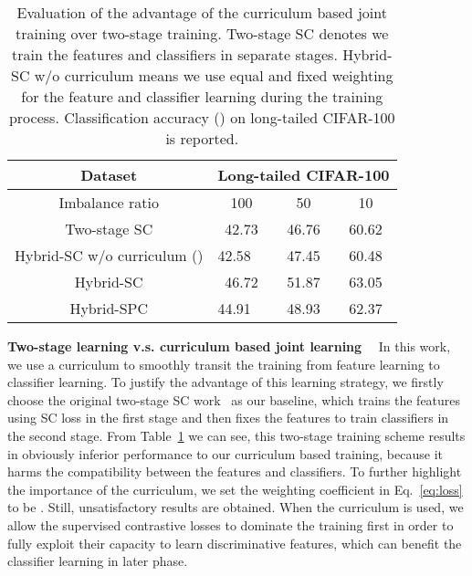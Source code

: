 \documentclass[final]{cvpr}
\begin{document}
\begin{table}[h]
\footnotesize
\center
\caption{Evaluation of the advantage of the curriculum based joint training over two-stage training. Two-stage SC denotes we train the features and classifiers in separate stages. Hybrid-SC w/o curriculum means we use equal and fixed weighting for the feature and classifier learning during the training process. Classification accuracy () on long-tailed CIFAR-100 is reported.}
\vspace{0.5em}
\label{tab:two-stage}
\begin{tabular}{|c||c|c|c|}
\hline
Dataset                                        & \multicolumn{3}{c|}{Long-tailed CIFAR-100}                                     \\ \hline 
Imbalance ratio                                & 100                        & \multicolumn{1}{c|}{50} & \multicolumn{1}{c|}{10} \\ \hline \hline
Two-stage SC                              & 42.73                      & 46.76                   & \multicolumn{1}{c|}{60.62}  \\ \hline
\multicolumn{1}{|l||}{Hybrid-SC w/o curriculum ()} & \multicolumn{1}{l|}{42.58} & 47.45                   & 60.48                   \\ \hline
Hybrid-SC                                      & 46.72                      & 51.87                   & 63.05                   \\ \hline
Hybrid-SPC                                     & \multicolumn{1}{l|}{44.91} & 48.93                   & 62.37                   \\ \hline
\end{tabular}
\end{table}


 
\par{\textbf{Two-stage learning v.s. curriculum based joint learning}}~~ In this work, we use a curriculum to smoothly transit the training from feature learning to classifier learning. To justify the advantage of this learning strategy, we firstly choose the original two-stage SC work~\cite{SC} as our baseline, which trains the features using SC loss in the first stage and then fixes the features to train classifiers in the second stage.
From Table~\ref{tab:two-stage} we can see, this two-stage training scheme results in obviously inferior performance to our curriculum based training, because it harms the compatibility between the features and classifiers.
To further highlight the importance of the curriculum, we set the weighting coefficient  in Eq.~\eqref{eq:loss} to be . Still, unsatisfactory results are obtained. When the curriculum is used, we allow the supervised contrastive losses to dominate the training first in order to fully exploit their capacity to learn discriminative features, which can benefit the classifier learning in later phase. 
\end{document}
